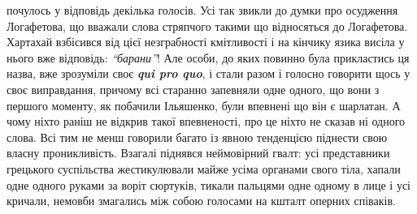 \documentclass[a4paper,20pt]{report}
\begin{document}
почулось у відповідь декілька голосів. Усі так звикли до думки про осудження Логафетова, що
вважали слова стряпчого такими що відносяться до Логафетова. Хартахай взбісився від цієї
незграбності кмітливості і на кінчику язика висіла у нього вже відповідь: \emph{``барани''}!
Але особи, до яких повинно була прикластись ця назва, вже зрозуміли своє
\textbf{\em qui pro quo}, і стали разом і голосно говорити щось у
своє виправдання, причому всі старанно запевняли одне одного, що вони з першого моменту,
як побачили Ільяшенко, були впевнені що він є шарлатан. А чому ніхто раніш не відкрив такої
впевненості, про це ніхто не сказав ні одного слова. Всі тим не менш говорили багато із явною
тенденцією піднести свою власну проникливість.
Взагалі піднявся неймовірний гвалт: усі представники грецького суспільства
жестикулювали майже усіма органами свого тіла, хапали одне одного руками за
воріт сюртуків, тикали пальцями одне одному в лице і усі кричали, немовби
змагались між собою голосами на кшталт оперних співаків.
\end{document}
